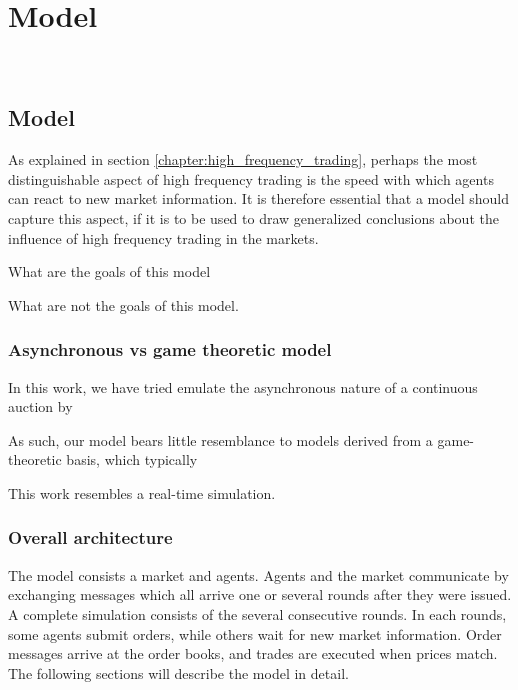
\chapter{Model} %

\label{chapter:model} %
$\frac{}{}$
	

\section{Model}
As explained in section \ref{chapter:high_frequency_trading}, perhaps the most distinguishable aspect of high frequency trading is the speed with which agents can react to new market information. It is therefore essential that a model should capture this aspect, if it is to be used to draw generalized conclusions about the influence of high frequency trading in the markets.

What are the goals of this model

What are not the goals of this model.

\subsection{Asynchronous vs game theoretic model}
In this work, we have tried emulate the asynchronous nature of a continuous auction by 

As such, our model bears little resemblance to models derived from a game-theoretic basis, which typically 

This work resembles a real-time simulation.

\subsection{Overall architecture}
The model consists a market and agents. Agents and the market communicate by exchanging messages which all arrive one or several rounds after they were issued. A complete simulation consists of the several consecutive rounds. In each rounds, some agents submit orders, while others wait for new market information. Order messages arrive at the order books, and trades are executed when prices match.  The following sections will describe the model in detail.



